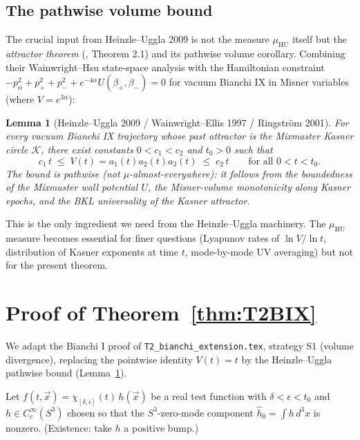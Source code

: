 \documentclass[11pt,a4paper]{article}
\newtheorem{lemma}[theorem]{Lemma}
\theoremstyle{definition}
\newcommand{\rmHU}{\mathrm{HU}}
\begin{document}
\subsection{The pathwise volume bound}

The crucial input from Heinzle--Uggla 2009 is not the measure $\mu_\rmHU$
itself but the \emph{attractor theorem} (\cite{HeinzleUgglaAttractor},
Theorem 2.1) and its pathwise volume corollary. Combining their
Wainwright--Hsu state-space analysis with the Hamiltonian constraint
$-p_\alpha^2+p_+^2+p_-^2+e^{-4\alpha}U(\beta_+,\beta_-)=0$ for vacuum
Bianchi IX in Misner variables (where $V=e^{3\alpha}$):

\begin{lemma}[Heinzle--Uggla 2009 / Wainwright--Ellis 1997 / Ringstr\"om 2001]
\label{lem:vol}
For every vacuum Bianchi IX trajectory whose past attractor is the
Mixmaster Kasner circle $\mathcal K$, there exist constants
$0<c_1<c_2$ and $t_0>0$ such that
\[
  c_1\,t \;\le\; V(t)=a_1(t)a_2(t)a_3(t) \;\le\; c_2\,t
  \qquad \text{for all }0<t<t_0.
\]
The bound is \emph{pathwise} (not $\mu$-almost-everywhere): it follows from
the boundedness of the Mixmaster wall potential $U$, the Misner-volume
monotonicity along Kasner epochs, and the BKL universality of the Kasner
attractor.
\end{lemma}

This is the only ingredient we need from the Heinzle--Uggla machinery.
The $\mu_\rmHU$ measure becomes essential for finer questions (Lyapunov
rates of $\ln V/\ln t$, distribution of Kasner exponents at time $t$,
mode-by-mode UV averaging) but not for the present theorem.

\section{Proof of Theorem~\ref{thm:T2BIX}}

We adapt the Bianchi I proof of \texttt{T2\_bianchi\_extension.tex},
strategy S1 (volume divergence), replacing the pointwise identity
$V(t)=t$ by the Heinzle--Uggla pathwise bound (Lemma~\ref{lem:vol}).

Let $f(t,\vec x)=\chi_{[\delta,\epsilon]}(t)\,h(\vec x)$ be a real
test function with $\delta<\epsilon<t_0$ and $h\in C^\infty_c(S^3)$
chosen so that the $S^3$-zero-mode component $\hat h_0=\int h\,d^3x$ is
nonzero. (Existence: take $h$ a positive bump.)
\end{document}

